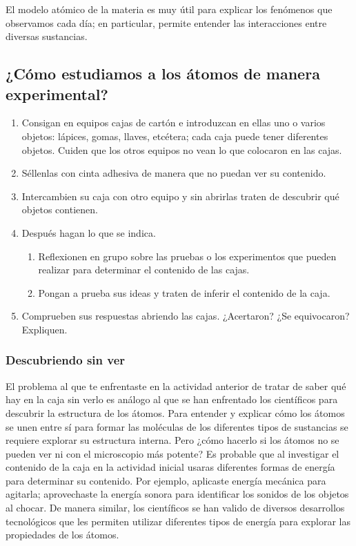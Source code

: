 El modelo atómico de la materia es muy útil para explicar los fenómenos que observamos cada día;
en particular, permite entender las interacciones entre diversas sustancias.

\newpage
\subsection{¿Cómo estudiamos a los átomos de manera experimental?}
\begin{boxK}
    \begin{enumerate}
        \item Consigan en equipos cajas de cartón e introduzcan en ellas uno o varios objetos: lápices, gomas,
              llaves, etcétera; cada caja puede tener diferentes objetos. Cuiden que los otros equipos no vean
              lo que colocaron en las cajas.
        \item Séllenlas con cinta adhesiva de manera que no puedan ver su contenido.
        \item Intercambien su caja con otro equipo y sin abrirlas traten de descubrir qué objetos contienen.
        \item Después hagan lo que se indica.
              \begin{enumerate}
                  \item Reflexionen en grupo sobre las pruebas o los experimentos que pueden realizar para determinar
                        el contenido de las cajas.
                  \item Pongan a prueba sus ideas y traten de inferir el contenido de la caja.
              \end{enumerate}
        \item Comprueben sus respuestas abriendo las cajas. ¿Acertaron? ¿Se equivocaron? Expliquen.
    \end{enumerate}
\end{boxK}


\subsubsection{Descubriendo sin ver}

El problema al que te enfrentaste en la actividad anterior de tratar de saber qué hay en la caja sin verlo
es análogo al que se han enfrentado los científicos para descubrir la estructura de los átomos.
Para entender y explicar cómo los átomos se unen entre sí para formar las moléculas de los diferentes
tipos de sustancias se requiere explorar su estructura interna. Pero ¿cómo hacerlo si los átomos no se
pueden ver ni con el microscopio más potente? Es probable que al investigar el contenido de la caja en
la actividad inicial usaras diferentes formas de energía para determinar su contenido.
Por ejemplo, aplicaste energía mecánica para agitarla; aprovechaste la energía sonora para identificar
los sonidos de los objetos al chocar. De manera similar, los científicos se han valido de diversos desarrollos
tecnológicos que les permiten utilizar diferentes tipos de energía para explorar las propiedades de los átomos.

